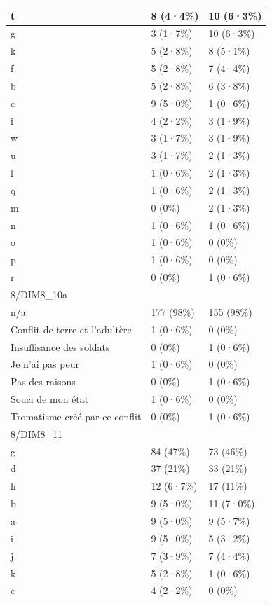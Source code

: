 \documentclass[
]{book}
\begin{document}
\begin{tabular}{l|l|l}
\hline
t & 8 (4·4\%) & 10 (6·3\%)\\
\hline
g & 3 (1·7\%) & 10 (6·3\%)\\
\hline
k & 5 (2·8\%) & 8 (5·1\%)\\
\hline
f & 5 (2·8\%) & 7 (4·4\%)\\
\hline
b & 5 (2·8\%) & 6 (3·8\%)\\
\hline
c & 9 (5·0\%) & 1 (0·6\%)\\
\hline
i & 4 (2·2\%) & 3 (1·9\%)\\
\hline
w & 3 (1·7\%) & 3 (1·9\%)\\
\hline
u & 3 (1·7\%) & 2 (1·3\%)\\
\hline
l & 1 (0·6\%) & 2 (1·3\%)\\
\hline
q & 1 (0·6\%) & 2 (1·3\%)\\
\hline
m & 0 (0\%) & 2 (1·3\%)\\
\hline
n & 1 (0·6\%) & 1 (0·6\%)\\
\hline
o & 1 (0·6\%) & 0 (0\%)\\
\hline
p & 1 (0·6\%) & 0 (0\%)\\
\hline
r & 0 (0\%) & 1 (0·6\%)\\
\hline
8/DIM8\_10a &  & \\
\hline
n/a & 177 (98\%) & 155 (98\%)\\
\hline
Conflit de terre et l'adultère & 1 (0·6\%) & 0 (0\%)\\
\hline
Insuffisance des soldats & 0 (0\%) & 1 (0·6\%)\\
\hline
Je n'ai pas peur & 1 (0·6\%) & 0 (0\%)\\
\hline
Pas des raisons & 0 (0\%) & 1 (0·6\%)\\
\hline
Souci de mon état & 1 (0·6\%) & 0 (0\%)\\
\hline
Tromatisme créé par ce conflit & 0 (0\%) & 1 (0·6\%)\\
\hline
8/DIM8\_11 &  & \\
\hline
g & 84 (47\%) & 73 (46\%)\\
\hline
d & 37 (21\%) & 33 (21\%)\\
\hline
h & 12 (6·7\%) & 17 (11\%)\\
\hline
b & 9 (5·0\%) & 11 (7·0\%)\\
\hline
a & 9 (5·0\%) & 9 (5·7\%)\\
\hline
i & 9 (5·0\%) & 5 (3·2\%)\\
\hline
j & 7 (3·9\%) & 7 (4·4\%)\\
\hline
k & 5 (2·8\%) & 1 (0·6\%)\\
\hline
c & 4 (2·2\%) & 0 (0\%)\\

\end{tabular}
\end{document}
